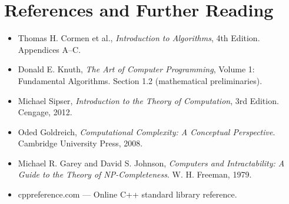 \section{References and Further Reading}

\begin{itemize}
\item Thomas H. Cormen et al., \textit{Introduction to Algorithms}, 4th Edition. Appendices A–C.
\item Donald E. Knuth, \textit{The Art of Computer Programming}, Volume 1: Fundamental Algorithms. Section 1.2 (mathematical preliminaries).
\item Michael Sipser, \textit{Introduction to the Theory of Computation}, 3rd Edition. Cengage, 2012.
\item Oded Goldreich, \textit{Computational Complexity: A Conceptual Perspective}. Cambridge University Press, 2008.
\item Michael R. Garey and David S. Johnson, \textit{Computers and Intractability: A Guide to the Theory of NP-Completeness}. W. H. Freeman, 1979.
\item cppreference.com — Online C++ standard library reference.
\end{itemize}

